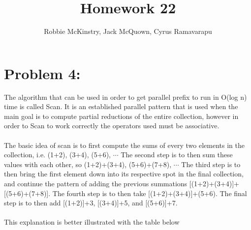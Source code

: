\documentclass[12pt]{article}
\begin{document}
\title{Homework 22}
\author{Robbie McKinstry, Jack McQuown, Cyrus Ramavarapu}
\renewcommand{\today}{24 October 2016}
\renewcommand{\baselinestretch}{1.5}
\maketitle

\section*{Problem 4: }
The algorithm that can be used in order to get parallel prefix to run in {O(log n)} time is called Scan. It is an established parallel 
pattern that is used when the main goal is to compute partial reductions of the entire collection, however in order to Scan to work 
correctly the operators used must be associative.\\\\
The basic idea of scan is to first compute the sums of every two elements in the collection, i.e. (1+2), (3+4), (5+6), {$\cdots$} The second step is to then sum these values with each other, so (1+2)+(3+4), (5+6)+(7+8), {$\cdots$} The third step is to then bring the first element down into its respective spot in the final collection, and continue the pattern of adding the previous summations
[(1+2)+(3+4)]+[(5+6)+(7+8)]. The fourth step is to then take [(1+2)+(3+4)]+(5+6). The final step is to then add [(1+2)]+3, [(3+4)]+5, and [(5+6)]+7.\\\\
This explanation is better illustrated with the table below\\
\end{document}
